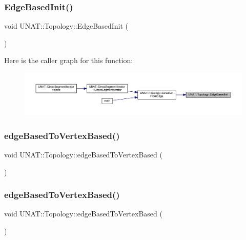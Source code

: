 \subsubsection{\texorpdfstring{EdgeBasedInit()}{EdgeBasedInit()}\hspace{0.1cm}{\footnotesize\ttfamily [3/3]}}
{\footnotesize\ttfamily void U\+N\+A\+T\+::\+Topology\+::\+Edge\+Based\+Init (\begin{DoxyParamCaption}{ }\end{DoxyParamCaption})\hspace{0.3cm}{\ttfamily [private]}}

Here is the caller graph for this function\+:
\nopagebreak
\begin{figure}[H]
\begin{center}
\leavevmode
\includegraphics[width=350pt]{classUNAT_1_1Topology_a7d880e2443af9721908ec8607baf968d_icgraph}
\end{center}
\end{figure}
\mbox{\label{classUNAT_1_1Topology_aeac30ca87544104afb11344fdd5ac3a9}} 
\subsubsection{\texorpdfstring{edgeBasedToVertexBased()}{edgeBasedToVertexBased()}\hspace{0.1cm}{\footnotesize\ttfamily [1/3]}}
{\footnotesize\ttfamily void U\+N\+A\+T\+::\+Topology\+::edge\+Based\+To\+Vertex\+Based (\begin{DoxyParamCaption}{ }\end{DoxyParamCaption})}

\mbox{\label{classUNAT_1_1Topology_aeac30ca87544104afb11344fdd5ac3a9}} 
\subsubsection{\texorpdfstring{edgeBasedToVertexBased()}{edgeBasedToVertexBased()}\hspace{0.1cm}{\footnotesize\ttfamily [2/3]}}
{\footnotesize\ttfamily void U\+N\+A\+T\+::\+Topology\+::edge\+Based\+To\+Vertex\+Based (\begin{DoxyParamCaption}{ }\end{DoxyParamCaption})}

